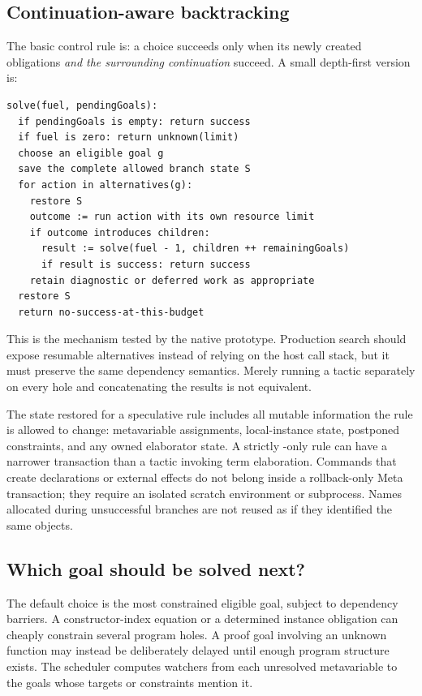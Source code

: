 \subsection{Continuation-aware backtracking}
The basic control rule is: a choice succeeds only when its newly created obligations \emph{and the surrounding continuation} succeed. A small depth-first version is:
\begin{lstlisting}
solve(fuel, pendingGoals):
  if pendingGoals is empty: return success
  if fuel is zero: return unknown(limit)
  choose an eligible goal g
  save the complete allowed branch state S
  for action in alternatives(g):
    restore S
    outcome := run action with its own resource limit
    if outcome introduces children:
      result := solve(fuel - 1, children ++ remainingGoals)
      if result is success: return success
    retain diagnostic or deferred work as appropriate
  restore S
  return no-success-at-this-budget
\end{lstlisting}
This is the mechanism tested by the native prototype. Production search should expose resumable alternatives instead of relying on the host call stack, but it must preserve the same dependency semantics. Merely running a tactic separately on every hole and concatenating the results is not equivalent.

The state restored for a speculative rule includes all mutable information the rule is allowed to change: metavariable assignments, local-instance state, postponed constraints, and any owned elaborator state. A strictly -only rule can have a narrower transaction than a tactic invoking term elaboration. Commands that create declarations or external effects do not belong inside a rollback-only Meta transaction; they require an isolated scratch environment or subprocess. Names allocated during unsuccessful branches are not reused as if they identified the same objects.

\subsection{Which goal should be solved next?}
The default choice is the most constrained eligible goal, subject to dependency barriers. A constructor-index equation or a determined instance obligation can cheaply constrain several program holes. A proof goal involving an unknown function may instead be deliberately delayed until enough program structure exists. The scheduler computes watchers from each unresolved metavariable to the goals whose targets or constraints mention it.

